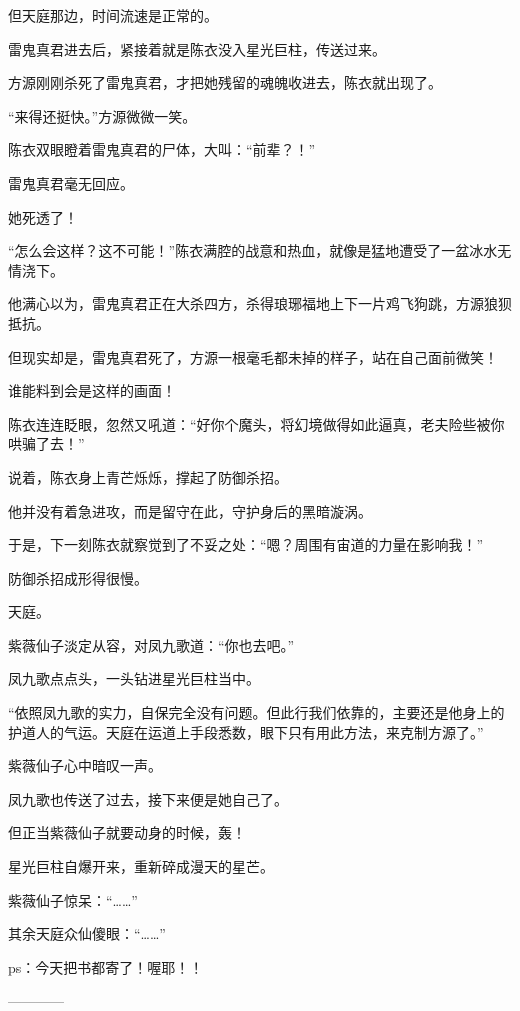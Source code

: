 \begin{this_body}
但天庭那边，时间流速是正常的。

雷鬼真君进去后，紧接着就是陈衣没入星光巨柱，传送过来。

方源刚刚杀死了雷鬼真君，才把她残留的魂魄收进去，陈衣就出现了。

“来得还挺快。”方源微微一笑。

陈衣双眼瞪着雷鬼真君的尸体，大叫：“前辈？！”

雷鬼真君毫无回应。

她死透了！

“怎么会这样？这不可能！”陈衣满腔的战意和热血，就像是猛地遭受了一盆冰水无情浇下。

他满心以为，雷鬼真君正在大杀四方，杀得琅琊福地上下一片鸡飞狗跳，方源狼狈抵抗。

但现实却是，雷鬼真君死了，方源一根毫毛都未掉的样子，站在自己面前微笑！

谁能料到会是这样的画面！

陈衣连连眨眼，忽然又吼道：“好你个魔头，将幻境做得如此逼真，老夫险些被你哄骗了去！”

说着，陈衣身上青芒烁烁，撑起了防御杀招。

他并没有着急进攻，而是留守在此，守护身后的黑暗漩涡。

于是，下一刻陈衣就察觉到了不妥之处：“嗯？周围有宙道的力量在影响我！”

防御杀招成形得很慢。

天庭。

紫薇仙子淡定从容，对凤九歌道：“你也去吧。”

凤九歌点点头，一头钻进星光巨柱当中。

“依照凤九歌的实力，自保完全没有问题。但此行我们依靠的，主要还是他身上的护道人的气运。天庭在运道上手段悉数，眼下只有用此方法，来克制方源了。”

紫薇仙子心中暗叹一声。

凤九歌也传送了过去，接下来便是她自己了。

但正当紫薇仙子就要动身的时候，轰！

星光巨柱自爆开来，重新碎成漫天的星芒。

紫薇仙子惊呆：“……”

其余天庭众仙傻眼：“……”

ps：今天把书都寄了！喔耶！！

------------

\end{this_body}

